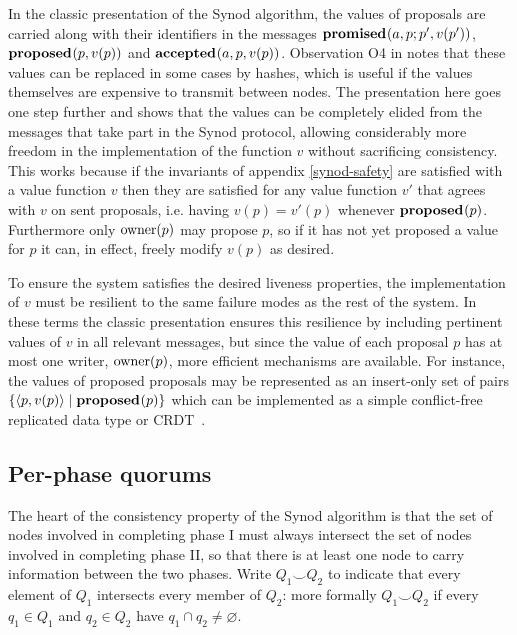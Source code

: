 \documentclass[journal]{IEEEtran}
\begin{document}
In the classic presentation of the Synod algorithm, the values of proposals are
carried along with their identifiers in the messages $\mathbf{promised}_{}(a,p; p',v(p')
)$, $\mathbf{proposed}_{}( p,v(p))$ and $\mathbf{accepted}_{}(a, p,v(p) )$. Observation O4 in
\cite{cheap-paxos} notes that these values can be replaced in some cases by
hashes, which is useful if the values themselves are expensive to transmit
between nodes. The presentation here goes one step further and shows that the
values can be completely elided from the messages that take part in the Synod
protocol, allowing considerably more freedom in the implementation of the
function $v$ without sacrificing consistency.  This works because if the
invariants of appendix \ref{synod-safety} are satisfied with a value function
$v$ then they are satisfied for any value function $v'$ that agrees with $v$ on
sent proposals, i.e. having $v(p) = v'(p)$ whenever $\mathbf{proposed}_{}(p)$.  Furthermore
only $\mathrm{owner}(p)$ may propose $p$, so if it has not yet proposed a value for $p$
it can, in effect, freely modify $v(p)$ as desired.

To ensure the system satisfies the desired liveness properties, the
implementation of $v$ must be resilient to the same failure modes as the rest
of the system. In these terms the classic presentation ensures this resilience
by including pertinent values of $v$ in all relevant messages, but since the
value of each proposal $p$ has at most one writer, $\mathrm{owner}(p)$, more efficient
mechanisms are available. For instance, the values of proposed proposals may be
represented as an insert-only set of pairs $\{ \langle p, v(p) \rangle \mid
\mathbf{proposed}_{}(p) \}$ which can be implemented as a simple conflict-free replicated
data type or CRDT~\cite{crdts}.

\subsection{Per-phase quorums}\label{per-phase-quorums}

The heart of the consistency property of the Synod algorithm is that the set of
nodes involved in completing phase I must always intersect the set of nodes
involved in completing phase II, so that there is at least one node to carry
information between the two phases. Write $Q_1 \smile Q_2$ to indicate that
every element of $Q_1$ intersects every member of $Q_2$: more formally $Q_1
\smile Q_2$ if every $q_1 \in Q_1$ and $q_2 \in Q_2$ have ${q_1 \cap q_2 \ne
\varnothing}$.
\end{document}
